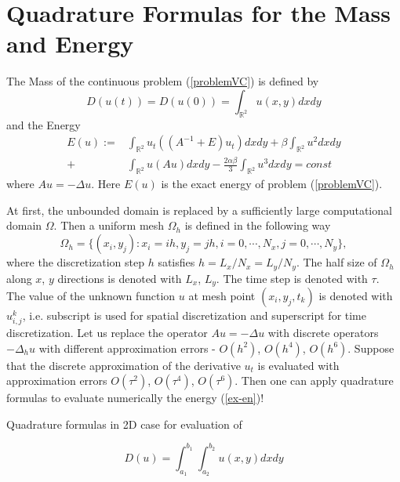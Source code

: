 \documentclass[%
 aip,
cp,  %
 amsmath,amssymb,%
 reprint,%
]{revtex4-2}
\newcommand{\rf}[1]{(\ref{#1})}
\newcommand{\RR}{\mathbb{R}}
\begin{document}
\section{Quadrature Formulas for the Mass and Energy}

The Mass of the continuous problem \rf{problemVC} is defined by
\begin{equation}\label{int}
D(u(t))=D(u(0))=\int_{\RR^2} u(x,y)dx dy
\end{equation}
and the Energy
\begin{align}\label{ex-en}
E(u):=&\int_{\RR^2} u_t \left((A^{-1}+E)u_t\right) dxdy+
\beta \int_{\RR^2} u^2 dxdy \nonumber\\
+& \int_{\RR^2}u \left(A u\right) dxdy
-\frac{2 \alpha \beta}{3} \int_{\RR^2} u^3 dxdy =const
\end{align}
where $Au=-\Delta u$. Here $E(u)$ is the exact energy of problem \rf{problemVC}.

At first, the unbounded domain is replaced by a sufficiently large computational domain $\Omega$. Then a uniform mesh $\Omega_h$ is defined in the following way
$$
\Omega_h = \{(x_i,y_j): x_i = ih, y_j = jh, i = 0,\cdots ,N_x, j = 0,\cdots , N_y \},
$$
where the discretization step $h$ satisfies $h = L_x/N_x = L_y/N_y$. The half size of $\Omega_h$ along $x$, $y$ directions is denoted with $L_x$, $L_y$. The time step is denoted with $\tau$. The value of the unknown function $u$ at mesh point $(x_i,y_j,t_k)$ is denoted with $u_{i,j}^k$, i.e. subscript is used for spatial discretization and superscript for time discretization.
Let us replace the operator $Au=-
\Delta u$ with discrete operators $-\Delta_h u$ with different approximation errors - $O(h^2)$, $O(h^4)$, $O(h^6)$. Suppose that the discrete approximation of the derivative $u_t$ is evaluated with approximation errors $O(\tau^2)$, $O(\tau^4)$, $O(\tau^6)$. Then one can apply quadrature formulas to evaluate numerically the energy \rf{ex-en}!




Quadrature formulas in 2D case for evaluation of 

\begin{equation}\label{int}
D(u)=\int_{a_1}^{b_1} \int_{a_2}^{b_2} u(x,y)dx dy
\end{equation}
\end{document}
